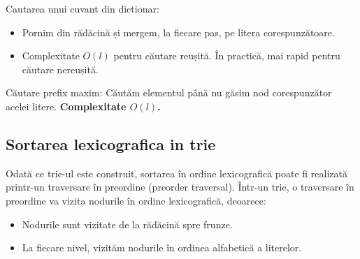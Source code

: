 \documentclass[11pt,a4paper]{article}
\theoremstyle{definition}
\theoremstyle{plain}
\theoremstyle{remark}
\begin{document}
Cautarea unui cuvant din dictionar:
\begin{itemize}
    \item Pornim din rădăcină și mergem, la ﬁecare pas, pe litera corespunzătoare.
    \item Complexitate $O(l)$ pentru căutare reușită.
    În practică, mai rapid pentru căutare nereușită.
\end{itemize}

Căutare preﬁx maxim: Căutăm elementul până nu găsim nod corespunzător acelei litere. \textbf{Complexitate $O(l)$.}

\subsection*{Sortarea lexicografica in trie}
Odată ce trie-ul este construit, sortarea în ordine lexicografică poate fi realizată printr-un traversare în preordine (preorder traversal). Într-un trie, o traversare în preordine va vizita nodurile în ordine lexicografică, deoarece:

\begin{itemize}
    \item Nodurile sunt vizitate de la rădăcină spre frunze.
    \item La fiecare nivel, vizităm nodurile în ordinea alfabetică a literelor.
\end{itemize}
\end{document}
